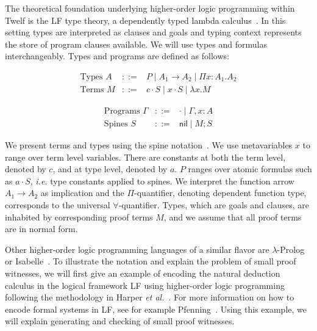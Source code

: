 \documentclass{llncs}
\newcommand{\comb}{\cdot}
\newcommand{\nil}{\mathsf{nil}}
\begin{document}
The theoretical foundation underlying higher-order logic programming
within Twelf is the LF type theory, a dependently
typed lambda calculus~\cite{Pfenning91lf}. In this setting types are interpreted as
clauses and goals and typing context represents the store of program
clauses available. We will use types and formulas
interchangeably. Types and programs are defined as follows: 

\begin{minipage}[b]{6cm}
\[
\begin{array}{lcl}
\mbox{Types } A & ::= & P \mid  A_1 \rightarrow A_2 \mid \Pi x:A_1.A_2 \\
\mbox{Terms }  M & ::= & c \comb S \mid x \comb S \mid \lambda x. M  
\end{array}
\]
\end{minipage}
\begin{minipage}[b]{6cm}
\[
\begin{array}{lcl}
\mbox{Programs }  \Gamma & ::= & \cdot \mid \Gamma, x:A \\
\mbox{Spines } S & ::= & \nil \mid M ; S
\end{array}
\]
\end{minipage}

We present terms and types using the spine
notation~\cite{cervesato+:spine}. We use metavariables $x$ to range
over term level variables. There are constants at both the term level,
denoted by $c$, and at type level, denoted by $a$.  $P$ ranges over
atomic formulas such as $a \cdot S$, {\em i.e.} type constants applied
to spines. We interpret the function arrow $A_1 \rightarrow A_2$ as
implication and the $\Pi$-quantifier, denoting dependent function
type, corresponds to the universal $\forall$-quantifier. Types, which
are goals and clauses, are inhabited by corresponding proof terms $M$,
and we assume that all proof terms are in normal form.

Other higher-order logic programming languages of a similar flavor are
$\lambda$-Prolog~\cite{Nadathur99cade} or
Isabelle~\cite{Paulson86}. To illustrate the notation and explain the
problem of small proof witnesses, we will first give an example of
encoding the natural deduction calculus in the logical framework LF
using higher-order logic programming following the methodology in
Harper {\em et al.}~\cite{Harper93jacm}. For more information on how to
encode formal systems in LF, see for example
Pfenning~\cite{Pfenning97}.  Using this example, we will explain
generating and checking of small proof witnesses.
\end{document}
